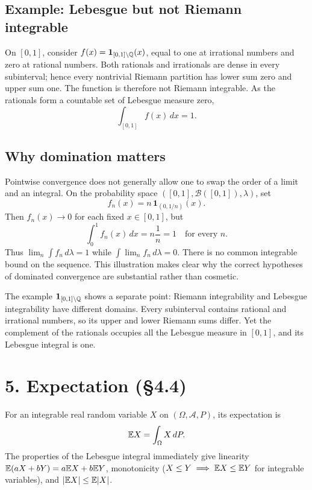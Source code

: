 \documentclass[10pt,a4paper]{article}
\begin{document}
\subsection*{Example: Lebesgue but not Riemann integrable}
On $[0,1]$, consider $f(x)=\mathbf1_{[0,1]\setminus\mathbb Q}(x)$, equal to one at irrational numbers and zero at rational numbers. Both rationals and irrationals are dense in every subinterval; hence every nontrivial Riemann partition has lower sum zero and upper sum one. The function is therefore not Riemann integrable. As the rationals form a countable set of Lebesgue measure zero,
\[
\int_{[0,1]}f(x)\,dx=1.
\]


\subsection*{Why domination matters}
Pointwise convergence does not generally allow one to swap the order of a limit and an integral. On the probability space $([0,1],\mathcal B([0,1]),\lambda)$, set
\[
f_n(x)=n\,\mathbf1_{(0,1/n)}(x).
\]
Then $f_n(x)\to0$ for each fixed $x\in[0,1]$, but
\[
\int_0^1 f_n(x)\,dx=n\frac1n=1
\quad\text{for every }n.
\]
Thus $\lim_n\int f_n\,d\lambda=1$ while $\int\lim_n f_n\,d\lambda=0$. There is no common integrable bound on the sequence. This illustration makes clear why the correct hypotheses of dominated convergence are substantial rather than cosmetic.

The example $\mathbf1_{[0,1]\setminus\mathbb Q}$ shows a separate point: Riemann integrability and Lebesgue integrability have different domains. Every subinterval contains rational and irrational numbers, so its upper and lower Riemann sums differ. Yet the complement of the rationals occupies all the Lebesgue measure in $[0,1]$, and its Lebesgue integral is one.

\section*{5. Expectation (\S4.4)}
For an integrable real random variable $X$ on $(\Omega,\mathcal A,P)$, its expectation is
\[
\mathbb E X=\int_\Omega X\,dP.
\]
The properties of the Lebesgue integral immediately give linearity $\mathbb E(aX+bY)=a\mathbb E X+b\mathbb E Y$, monotonicity ($X\le Y\implies\mathbb E X\le\mathbb E Y$ for integrable variables), and $|\mathbb E X|\le\mathbb E|X|$.
\end{document}
